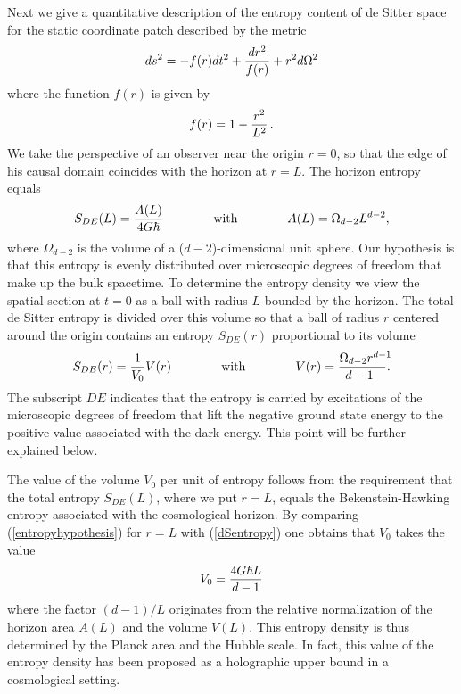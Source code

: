 \documentclass[a4paper,12pt]{article}
\newcommand{\be}{\begin{equation}}
\newcommand{\ee}{\end{equation}}
\begin{document}
\label{subsec:entropycontentds}

Next we give a quantitative description of the entropy content of de Sitter space for 
the static coordinate patch described by the metric\\[-2mm] 
\begin{equation}
\label{deSitter}
ds^2 = -f(r) dt^2 + {dr^2\over f(r)} +r^2d\Omega^2\\[-2mm] 
\end{equation}
where the function $f(r)$ is given by\\[-4mm]
\begin{equation}
f(r) =1-{r^2\over L^2} \, .
\end{equation}
We take the perspective of an observer near the origin $r=0$, so that the edge of
his causal domain coincides with the horizon at $r=L$. The horizon entropy equals 
\be
\label{dSentropy}
 S_{DE}(L) = {A(L)\over 4G\hbar} %
 \qquad\qquad \mbox{with} \qquad\qquad A(L) = \Omega_{d-2} L^{d-2} ,
\ee
where $\Omega_{d-2}$ is the volume of a ($d-2$)-dimensional unit sphere.
Our hypothesis is that this entropy is evenly distributed over microscopic 
degrees of freedom that make up the bulk spacetime. To determine the entropy density we view  
the spatial section at $t=0$ as a ball with radius $L$ bounded by the horizon. 
The total de Sitter entropy is divided over this volume so that a ball of radius $r$ 
centered around the origin contains an entropy $S_{DE}(r)$ proportional to its volume\\[-2mm]
\be
\label{entropyhypothesis}
 S_{DE}(r) = {1\over V_0}  V(r) %
 \qquad\qquad \mbox{with} \qquad\qquad V(r) = {\Omega_{d-2}  r^{d-1} \!\!\!\over \! \!\! d-1} .
\ee
The subscript $DE$ indicates that the entropy is carried by excitations of the 
microscopic degrees of freedom that lift the negative ground state energy to the positive value associated with the dark energy. This point will be further explained below. 

The value of the volume $V_0$ per unit of entropy follows from the requirement that 
the total entropy $S_{DE}(L)$, where we put   $r=L$, equals the Bekenstein-Hawking entropy associated with the cosmological horizon. 
By comparing (\ref{entropyhypothesis}) for $r=L$ with (\ref{dSentropy}) one obtains that  
  $V_0$  takes the value\\[-2mm]
\be
V_0 ={4G\hbar L\over d-1} 
\label{entropyvolume}  
\ee
where the factor $(d-1)/L$ originates from the relative normalization of the horizon area $A(L)$ and the volume $V(L)$. This entropy density is thus determined by the Planck area and the Hubble scale. In fact, this value of the entropy density has been proposed as a holographic upper bound in a cosmological setting.%
\end{document}
